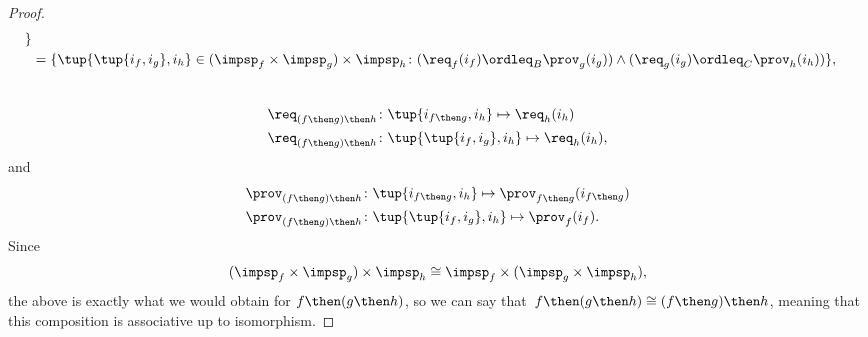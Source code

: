 \begin{proof}
\begin{equation}
\begin{aligned}
            \}                                 \\
             & =\{
            \tup{\tup{i_f, i_g},i_h} \in (\impsp_f \times \impsp_g) \times \impsp_{h}\colon
            (\req_f(i_f) \ordleq_{B} \prov_g(i_g))
            \wedge
            (\req_g(i_g) \ordleq_{C} \prov_h(i_h))
            \},
        \end{aligned}
    \end{equation}
    ~
    \begin{equation}
        \begin{aligned}
            \req_{(f\then g)\then h} & \colon  \tup{i_{f\then g},i_h} \mapsto \req_h(i_h)    \\
            \req_{(f\then g)\then h} & \colon  \tup{\tup{i_f, i_g},i_h} \mapsto \req_h(i_h),
        \end{aligned}
    \end{equation}
    and
    \begin{equation}
        \begin{aligned}
            \prov_{(f\then g)\then h} & \colon  \tup{i_{f\then g},i_h} \mapsto \prov_{f\then g}(i_{f\then g}) \\
            \prov_{(f\then g)\then h} & \colon  \tup{\tup{i_f, i_g},i_h} \mapsto \prov_f(i_f).
        \end{aligned}
    \end{equation}
    Since
    \begin{equation}
        (\impsp_f \times \impsp_g)
        \times \impsp_{h} \cong  \impsp_f \times (\impsp_g \times \impsp_{h}),
    \end{equation}
    the above is exactly what we would obtain for $f\then (g\then h)$, so we can say
    that~$f\then(g\then h)\cong (f\then g)\then h$, meaning that this composition is associative up to isomorphism.
\end{proof}

